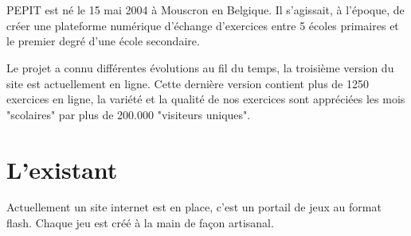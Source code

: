 \section{\pepit}
PEPIT est né le 15 mai 2004 à Mouscron en Belgique. Il s'agissait, à l'époque, de créer une plateforme numérique d'échange d'exercices entre 5 écoles primaires et le premier degré d'une école secondaire.


Le projet a connu différentes évolutions au fil du temps, la troisième version du site est actuellement en ligne. Cette dernière version contient plus de 1250 exercices en ligne, la variété et la qualité de nos exercices sont appréciées les mois "scolaires" par plus de 200.000 "visiteurs uniques".


\section{L'existant}
Actuellement un site internet est en place, c'est un portail de jeux au format flash. Chaque jeu est créé à la main de façon artisanal.

